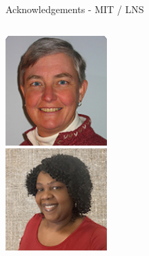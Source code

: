 \documentclass[aspectratio=169]{beamer}
\begin{document}
\begin{frame}{Acknowledgements - MIT / LNS}
    \begin{columns}
        \centering
        \centering
            
            \includegraphics[width=0.5\textwidth]{people/lns/karen.png}
            \includegraphics[width=0.5\textwidth]{people/lns/elsye.png}
            
        \centering
            

\end{columns}
\end{frame}
\end{document}
